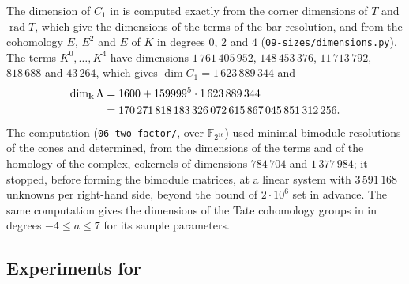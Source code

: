 The dimension of $C_1$ in  is computed exactly from the
corner dimensions of $T$ and $\operatorname{rad}T$, which give the dimensions
of the terms of the bar resolution, and from the cohomology $E$, $E^2$ and $E$
of $K$ in degrees $0$, $2$ and $4$ (\texttt{09-sizes/dimensions.py}). The
terms $K^0,\dots,K^4$ have dimensions $1\,761\,405\,952$, $148\,453\,376$,
$11\,713\,792$, $818\,688$ and $43\,264$, which gives ${\dim
C_1=1\,623\,889\,344}$
and
\[
  \begin{aligned}
    \dim_{\mathbf{k}}\Lambda&=1600+159999^5\cdot1\,623\,889\,344\\
    &=170\,271\,818\,183\,326\,072\,615\,867\,045\,851\,312\,256.
  \end{aligned}
\]
The computation (\texttt{06-two-factor/}, over $\mathbb{F}_{2^{16}}$)
used minimal bimodule resolutions of the cones and determined, from the
dimensions of the terms and of the homology of the complex, cokernels of
dimensions $784\,704$ and $1\,377\,984$; it
stopped, before forming the bimodule matrices, at a linear system with
$3\,591\,168$ unknowns per right-hand side, beyond the bound of ${2\cdot10^6}$
set in advance. The same computation gives the dimensions of the Tate cohomology
groups in  in degrees ${-4\leq a\leq7}$ for its sample
parameters.

\subsection*{Experiments for \texorpdfstring{}{Section
10}}

